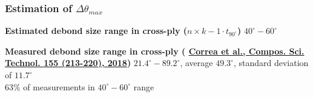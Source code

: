 \documentclass[first,firstsupp,lastsupp,last,hyperref,table]{ETHclass}
\begin{document}
%

\begin{frame}
\frametitle{\vspace{0.2cm}\small Estimation of $\Delta\theta_{max}$}
\vspace{-0.5cm}
\centering
\scriptsize
\begin{alertblock}{\centering\scriptsize\bf Estimated debond size range in cross-ply ($n\times k-1\cdot t_{90^{\circ}}$)}
\centering
$40^{\circ}-60^{\circ}$
\end{alertblock}
\pgfmathsetmacro{}
\pgfmathsetmacro{}
\begin{alertblock}{\centering\scriptsize\bf Measured debond size range in cross-ply ({\fontsize{\fontsizeref}{\stretchref} \selectfont \href{https://doi.org/10.1016/j.compscitech.2017.12.009}{Correa et al., Compos. Sci. Technol. \textbf{155} (213-220), 2018}})}
\centering
$21.4^{\circ}-89.2^{\circ}$, average $49.3^{\circ}$, standard deviation of $11.7^{\circ}$\\ $63\%$ of measurements in $40^{\circ}-60^{\circ}$ range
\end{alertblock}
\end{frame}
\end{document}
